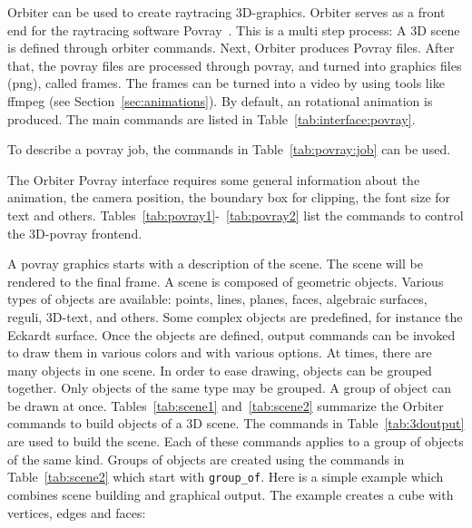 Orbiter can be used to create raytracing 3D-graphics.
Orbiter serves as a front end for the raytracing software Povray~\cite{povray}.
This is a multi step process: 
A 3D scene is defined through orbiter commands. 
Next, Orbiter produces Povray files. 
After that, the 
povray files are processed through povray, and turned into graphics files (png), called frames. 
The frames can be turned into a video 
by using tools like ffmpeg (see Section~\ref{sec:animations}).
By default, an rotational animation is produced. 
The main commands are listed in Table~\ref{tab:interface:povray}.

\bigskip

To describe a povray job, the commands in Table~\ref{tab:povray:job} can be used.

\bigskip

The Orbiter Povray interface requires some general information about the animation, 
the camera position, the boundary box for clipping, 
the font size for text and others.
Tables~\ref{tab:povray1}-~\ref{tab:povray2} 
list the commands to control the 3D-povray frontend.

\bigskip


A povray graphics starts with a description of the scene.
The scene will be rendered to the final frame. 
A scene is composed of geometric objects. 
Various types of objects are available: 
points, lines, planes, faces, algebraic surfaces, reguli, 3D-text,  
and others.
Some complex objects are predefined, 
for instance the Eckardt surface. 
Once the objects are defined, output commands can be invoked 
to draw them in various colors and with various options.
At times, there are many objects in one scene. 
In order to ease drawing, objects can be grouped together. 
Only objects of the same type may be grouped. 
A group of object can be drawn at once.
Tables~\ref{tab:scene1} and~\ref{tab:scene2} 
summarize the Orbiter commands to build objects of a 3D scene.
The commands in Table~\ref{tab:3doutput} are used to build the scene.
Each of these commands applies to a group of objects of the same kind. 
Groups of objects are created using the commands in 
Table~\ref{tab:scene2} which start with \verb'group_of'.
Here is a simple example which combines scene building and graphical output.
The example creates a cube with vertices, edges and faces:

